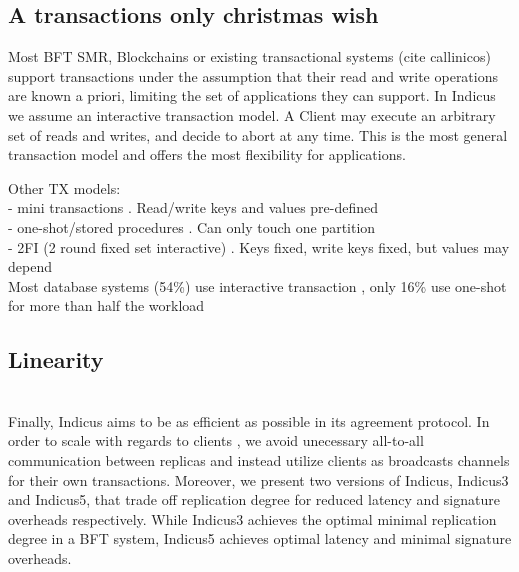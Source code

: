 \subsection{A transactions only christmas wish}
Most BFT SMR, Blockchains or existing transactional systems (cite callinicos) support transactions under the assumption that their read and write operations are known a priori, limiting the set of applications they can support. In Indicus we assume an interactive transaction model. A Client may execute an arbitrary set of reads and writes, and decide to abort at any time. This is the most general transaction model and offers the most flexibility for applications.


Other TX models:\\
- mini transactions \cite{aguilera2007sinfonia}. Read/write keys and values pre-defined\\
- one-shot/stored procedures \cite{mu2016consolidating, mu2014extracting}. Can only touch one partition\\
- 2FI (2 round fixed set interactive) \cite{yan2018carousel}. Keys fixed, write keys fixed, but values may depend\\
Most database systems (54\%) use interactive transaction \cite{meng2010database}, only 16\% use one-shot for more than half the workload

\subsection{Linearity}
\\
Finally, Indicus aims to be as efficient as possible in its agreement protocol. In order to scale with regards to clients , we avoid unecessary all-to-all communication between replicas and instead utilize clients as broadcasts channels for their own transactions. Moreover, we present two versions of Indicus, Indicus3 and Indicus5, that trade off replication degree for reduced latency and signature overheads respectively. While Indicus3 achieves the optimal minimal replication degree in a BFT system, Indicus5 achieves optimal latency and minimal signature overheads.


